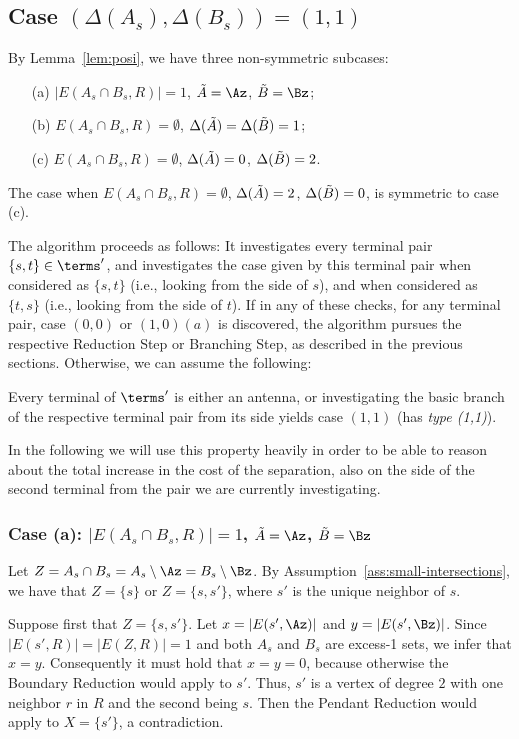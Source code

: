\subsection{Case $(\Delta(A_s),\Delta(B_s))=(1,1)$}

By Lemma~\ref{lem:posi}, we have three non-symmetric subcases:
\begin{itemize}
\item[(a)] $|E(A_s \cap B_s, R)|=1$, $\Atr=\Az$, $\Btr=\Bz$;
\item[(b)] $E(A_s \cap B_s, R) = \emptyset$, $\Delta(\tilde{A})=\Delta(\tilde{B})=1$;
\item[(c)] $E(A_s \cap B_s, R) = \emptyset$, $\Delta(\tilde{A})=0$, $\Delta(\tilde{B})=2$.
\end{itemize}
The case when $E(A_s \cap B_s, R) = \emptyset$, $\Delta(\tilde{A})=2$, $\Delta(\tilde{B})=0$, is symmetric to case (c).

The algorithm proceeds as follows: It investigates every terminal pair $\{s,t\}\in \terms'$, and investigates the case given by this terminal pair when considered as $\{s,t\}$ (i.e., looking from the side of $s$), and when considered as $\{t,s\}$ (i.e., looking from the side of $t$). If in any of these checks, for any terminal pair, case $(0,0)$ or $(1,0)(a)$ is discovered, the algorithm pursues the respective Reduction Step or Branching Step, as described in the previous sections. Otherwise, we can assume the following:
\begin{assumption}\label{ass:cases-left}
Every terminal of $\terms'$ is either an antenna, or investigating the basic branch of the respective terminal pair from its side yields case $(1,1)$ (has {\em{type (1,1)}}).
\end{assumption}
In the following we will use this property heavily in order to be able to reason about the total increase in the cost of the separation, also on the side of the second terminal from the pair we are currently investigating. 

\subsubsection{Case (a): $|E(A_s \cap B_s, R)|=1$, $\Atr=\Az$, $\Btr=\Bz$}



Let $Z=A_s\cap B_s=A_s\setminus \Az=B_s\setminus \Bz$. By Assumption~\ref{ass:small-intersections}, we have that $Z=\{s\}$ or $Z=\{s,s'\}$, where $s'$ is the unique neighbor of $s$. 

Suppose first that $Z=\{s,s'\}$. Let $x=|E(s',\Az)|$ and $y=|E(s',\Bz)|$. Since $|E(s',R)|=|E(Z,R)|=1$ and both $A_s$ and $B_s$ are excess-1 sets, we infer that $x=y$. Consequently it must hold that $x=y=0$, because otherwise the Boundary Reduction would apply to $s'$. Thus, $s'$ is a vertex of degree $2$ with one neighbor $r$ in $R$ and the second being $s$. Then the Pendant Reduction would apply to $X = \{s'\}$, a contradiction.

